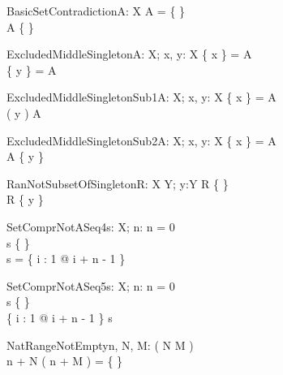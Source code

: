 \begin{theorem}{BasicSetContradiction}{A: \power X}
A = \{ \} \\
A \neq \{ \}
\end{theorem}

\begin{theorem}{ExcludedMiddleSingleton}{A: \power X; \const x, \const y: X}
\{ x \} = A \\
\{ y \} = A
\end{theorem}

\begin{theorem}{ExcludedMiddleSingletonSub1}{A: \power X; \const x, \const y: X}
\{ x \} = A \\
\se( y ) \subset A
\end{theorem}

\begin{theorem}{ExcludedMiddleSingletonSub2}{A: \power X; \const x, \const y: X}
\{ x \} = A \\
A  \subset \{ y \}
\end{theorem}

\begin{theorem}{RanNotSubsetOfSingleton}{R: X \rel Y; y:Y}
R \neq \{ \} \\
\ran R \subset \{ y \} 
\end{theorem}




\begin{theorem}{SetComprNotASeq4}{s: \seq X; n: \nat}
n = 0 \\
s \neq \{ \} \\
\dom s = \dom \{ i : 1 \upto \anything @ i + n - 1 \mapsto \anything \}
\end{theorem}

\begin{theorem}{SetComprNotASeq5}{s: \seq X; n: \nat}
n = 0 \\
s \neq \{ \} \\
\dom \{ i : 1 \upto \anything @ i + n - 1 \mapsto \anything \} \subset \dom s
\end{theorem}

\begin{theorem}{NatRangeNotEmpty}{n, \const N, \const M: \nat}
\eval( N \leq M ) \\
n + N \upto ( n + M ) = \{ \}
\end{theorem}

